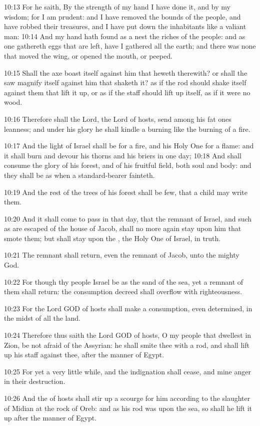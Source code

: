 10:13 For he saith, By the strength of my hand I have done it, and by
my wisdom; for I am prudent: and I have removed the bounds of the
people, and have robbed their treasures, and I have put down the
inhabitants like a valiant man: 10:14 And my hand hath found as a nest
the riches of the people: and as one gathereth eggs that are left,
have I gathered all the earth; and there was none that moved the wing,
or opened the mouth, or peeped.

10:15 Shall the axe boast itself against him that heweth therewith? or
shall the saw magnify itself against him that shaketh it? as if the
rod should shake itself against them that lift it up, or as if the
staff should lift up itself, as if it were no wood.

10:16 Therefore shall the Lord, the Lord of hosts, send among his fat
ones leanness; and under his glory he shall kindle a burning like the
burning of a fire.

10:17 And the light of Israel shall be for a fire, and his Holy One
for a flame: and it shall burn and devour his thorns and his briers in
one day; 10:18 And shall consume the glory of his forest, and of his
fruitful field, both soul and body: and they shall be as when a
standard-bearer fainteth.

10:19 And the rest of the trees of his forest shall be few, that a
child may write them.

10:20 And it shall come to pass in that day, that the remnant of
Israel, and such as are escaped of the house of Jacob, shall no more
again stay upon him that smote them; but shall stay upon the \LORD, the
Holy One of Israel, in truth.

10:21 The remnant shall return, even the remnant of Jacob, unto the
mighty God.

10:22 For though thy people Israel be as the sand of the sea, yet a
remnant of them shall return: the consumption decreed shall overflow
with righteousness.

10:23 For the Lord GOD of hosts shall make a consumption, even
determined, in the midst of all the land.

10:24 Therefore thus saith the Lord GOD of hosts, O my people that
dwellest in Zion, be not afraid of the Assyrian: he shall smite thee
with a rod, and shall lift up his staff against thee, after the manner
of Egypt.

10:25 For yet a very little while, and the indignation shall cease,
and mine anger in their destruction.

10:26 And the \LORD of hosts shall stir up a scourge for him according
to the slaughter of Midian at the rock of Oreb: and as his rod was
upon the sea, so shall he lift it up after the manner of Egypt.

